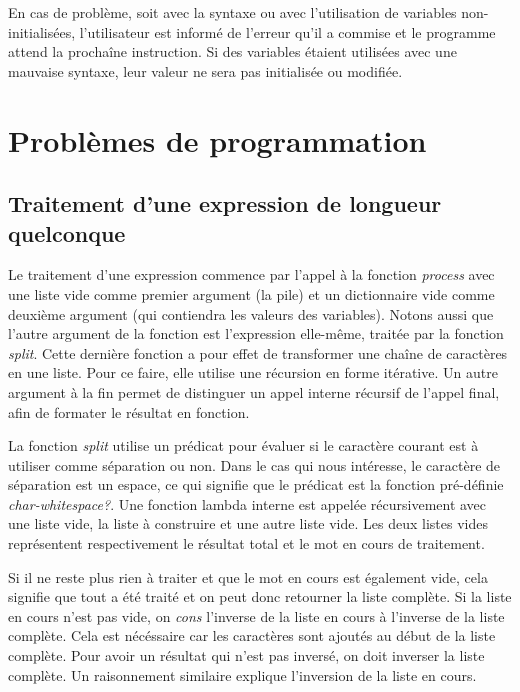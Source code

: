 \documentclass[letterpaper,12pt]{scrartcl}
\begin{document}
	En cas de problème, soit avec la syntaxe ou avec l'utilisation de variables non-initialisées, l'utilisateur est informé de l'erreur qu'il a commise et le programme attend la prochaîne instruction. Si des variables étaient utilisées avec une mauvaise syntaxe, leur valeur ne sera pas initialisée ou modifiée.
	
	
    
	\section{Problèmes de programmation}
		\subsection{Traitement d'une expression de longueur quelconque}
        Le traitement d'une expression commence par l'appel à la fonction \textit{process} avec une liste vide comme premier argument (la pile) et un dictionnaire vide comme deuxième argument (qui contiendra les valeurs des variables). Notons aussi que l'autre argument de la fonction est l'expression elle-même, traitée par la fonction \textit{split}. Cette dernière fonction a pour effet de transformer une chaîne de caractères en une liste. Pour ce faire, elle utilise une récursion en forme itérative. Un autre argument à la fin permet de distinguer un appel interne récursif de l'appel final, afin de formater le résultat en fonction.
        
        \vspace{0.5cm}
        
        La fonction \textit{split} utilise un prédicat pour évaluer si le caractère courant est à utiliser comme séparation ou non. Dans le cas qui nous intéresse, le caractère de séparation est un espace, ce qui signifie que le prédicat est la fonction pré-définie \textit{char-whitespace?}. Une fonction lambda interne est appelée récursivement avec une liste vide, la liste à construire et une autre liste vide. Les deux listes vides représentent respectivement le résultat total et le mot en cours de traitement.
        
        \vspace{0.5cm}
        
        Si il ne reste plus rien à traiter et que le mot en cours est également vide, cela signifie que tout a été traité et on peut donc retourner la liste complète. Si la liste en cours n'est pas vide, on \textit{cons} l'inverse de la liste en cours à l'inverse de la liste complète. Cela est nécéssaire car les caractères sont ajoutés au début de la liste complète. Pour avoir un résultat qui n'est pas inversé, on doit inverser la liste complète. Un raisonnement similaire explique l'inversion de la liste en cours.
        
\end{document}
